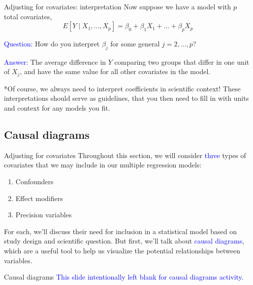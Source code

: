 \documentclass[10pt,t]{beamer}
\begin{document}
\begin{frame}{Adjusting for covariates: interpretation}
Now suppose we have a model with $p$ total covariates,
$$
E[Y \mid X_1, \dots, X_p] = \beta_0 + \beta_1 X_1 + \dots + \beta_p X_p
$$

\textcolor{blue}{Question:} How do you interpret $\beta_j$ for some general $j = 2, \dots, p$? \pause

\vspace{0.3cm}

\textcolor{blue}{Answer:} The average difference in $Y$ comparing two groups that differ in one unit of $X_j$, and have the same value for all other covariates in the model. \pause

\vspace{0.3cm}

*Of course, we always need to interpret coefficients in scientific context! These interpretations should serve as guidelines, that you then need to fill in with units and context for any models you fit.
\end{frame}


\subsection{Causal diagrams}

\begin{frame}{Adjusting for covariates}
Throughout this section, we will consider \textcolor{blue}{three} types of covariates that we may include in our multiple regression models:

\vspace{0.3cm}

\begin{enumerate}
	\item Confounders
	\item Effect modifiers
	\item Precision variables
\end{enumerate}

\vspace{0.3cm}

For each, we'll discuss their need for inclusion in a statistical model based on study design and scientific question. But first, we'll talk about \textcolor{blue}{causal diagrams}, which are a useful tool to help us visualize the potential relationships between variables.

\end{frame}

\begin{frame}{Causal diagrams}
\small \textcolor{blue}{This slide intentionally left blank for causal diagrams activity.}
\end{frame}
\end{document}
